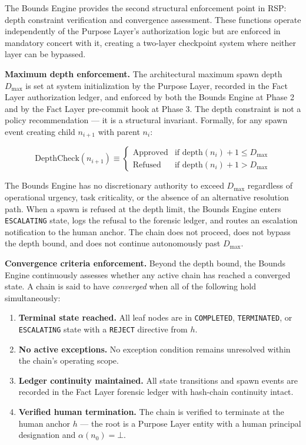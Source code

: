 The Bounds Engine provides the second structural enforcement point in RSP: depth constraint verification and convergence assessment. These functions operate independently of the Purpose Layer's authorization logic but are enforced in mandatory concert with it, creating a two-layer checkpoint system where neither layer can be bypassed.

\medskip
\noindent\textbf{Maximum depth enforcement.} The architectural maximum spawn depth $D_{\max}$ is set at system initialization by the Purpose Layer, recorded in the Fact Layer authorization ledger, and enforced by both the Bounds Engine at Phase 2 and by the Fact Layer pre-commit hook at Phase 3. The depth constraint is not a policy recommendation — it is a structural invariant. Formally, for any spawn event creating child $n_{i+1}$ with parent $n_i$:

\begin{equation}
\text{DepthCheck}(n_{i+1}) \equiv
\begin{cases}
\text{Approved} & \text{if } \text{depth}(n_i) + 1 \leq D_{\max} \\
\text{Refused} & \text{if } \text{depth}(n_i) + 1 > D_{\max}
\end{cases}
\label{eq:rs-depth-check}
\end{equation}

The Bounds Engine has no discretionary authority to exceed $D_{\max}$ regardless of operational urgency, task criticality, or the absence of an alternative resolution path. When a spawn is refused at the depth limit, the Bounds Engine enters \texttt{ESCALATING} state, logs the refusal to the forensic ledger, and routes an escalation notification to the human anchor. The chain does not proceed, does not bypass the depth bound, and does not continue autonomously past $D_{\max}$.

\medskip
\noindent\textbf{Convergence criteria enforcement.} Beyond the depth bound, the Bounds Engine continuously assesses whether any active chain has reached a converged state. A chain is said to have \emph{converged} when all of the following hold simultaneously:

\begin{enumerate}
    \item[(C1)]\textbf{Terminal state reached.} All leaf nodes are in \texttt{COMPLETED}, \texttt{TERMINATED}, or \texttt{ESCALATING} state with a \texttt{REJECT} directive from $h$.
    \item[(C2)]\textbf{No active exceptions.} No exception condition remains unresolved within the chain's operating scope.
    \item[(C3)]\textbf{Ledger continuity maintained.} All state transitions and spawn events are recorded in the Fact Layer forensic ledger with hash-chain continuity intact.
    \item[(C4)]\textbf{Verified human termination.} The chain is verified to terminate at the human anchor $h$ — the root is a Purpose Layer entity with a human principal designation and $\alpha(n_0) = \bot$.
\end{enumerate}

